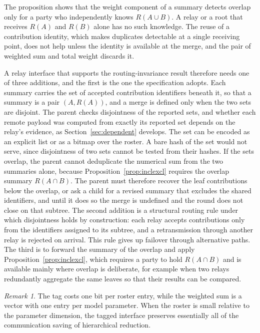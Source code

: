\documentclass[11pt]{article}
\theoremstyle{definition}
\theoremstyle{remark}
\newtheorem{remark}{Remark}
\begin{document}
The proposition shows that the weight component of a summary detects overlap only for a party who independently knows $R(A\cup B)$. A relay or a root that receives $R(A)$ and $R(B)$ alone has no such knowledge. The reuse of a contribution identity, which makes duplicates detectable at a single receiving point, does not help unless the identity is available at the merge, and the pair of weighted sum and total weight discards it.

A relay interface that supports the routing-invariance result therefore needs one of three additions, and the first is the one the specification adopts. Each summary carries the set of accepted contribution identifiers beneath it, so that a summary is a pair $(A,R(A))$, and a merge is defined only when the two sets are disjoint. The parent checks disjointness of the reported sets, and whether each remote payload was computed from exactly its reported set depends on the relay's evidence, as Section~\ref{sec:dependent} develops. The set can be encoded as an explicit list or as a bitmap over the roster. A bare hash of the set would not serve, since disjointness of two sets cannot be tested from their hashes. If the sets overlap, the parent cannot deduplicate the numerical sum from the two summaries alone, because Proposition~\ref{prop:inclexcl} requires the overlap summary $R(A\cap B)$. The parent must therefore recover the leaf contributions below the overlap, or ask a child for a revised summary that excludes the shared identifiers, and until it does so the merge is undefined and the round does not close on that subtree. The second addition is a structural routing rule under which disjointness holds by construction: each relay accepts contributions only from the identifiers assigned to its subtree, and a retransmission through another relay is rejected on arrival. This rule gives up failover through alternative paths. The third is to forward the summary of the overlap and apply Proposition~\ref{prop:inclexcl}, which requires a party to hold $R(A\cap B)$ and is available mainly where overlap is deliberate, for example when two relays redundantly aggregate the same leaves so that their results can be compared.

\begin{remark}
The tag costs one bit per roster entry, while the weighted sum is a vector with one entry per model parameter. When the roster is small relative to the parameter dimension, the tagged interface preserves essentially all of the communication saving of hierarchical reduction.
\end{remark}
\end{document}
